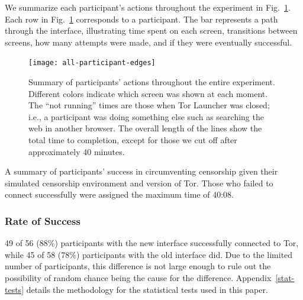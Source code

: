 \documentclass[USenglish,oneside,twocolumn]{article}
\begin{document}
{We summarize each participant's actions throughout the experiment in Fig.~\ref{fig:all-participant-edges}.
Each row in Fig.~\ref{fig:all-participant-edges} corresponds to a participant. The bar represents a path through the interface, illustrating time spent on each screen, transitions between screens, how many attempts were made, and if they were eventually successful. 

\begin{figure}
\centering
\texttt{[image: all-participant-edges]}
\caption{
Summary of participants' actions throughout the entire experiment.
Different colors indicate which screen was shown at each moment.
The ``not running'' times are those when Tor Launcher was closed;
i.e., a participant was doing something else
such as searching the web in another browser.
The overall length of the lines show the total time to completion,
except for those we cut off after approximately 40 minutes.
}
\label{fig:all-participant-edges}
\end{figure}

\begin{table}
\centering

\caption{
A summary of participants' success in circumventing censorship
given their simulated censorship environment and version of Tor. Those who
failed to connect successfully were assigned the maximum time of 40:08.
}
\label{table:participant-summary}
\end{table}

\subsubsection{Rate of Success} 
49 of 56 (88\%) participants with the new interface successfully connected to Tor, while 45 of 58 (78\%) participants with the old interface did. Due to the limited number of participants, this difference is not large enough to rule out the possibility of random chance being the cause for the difference. Appendix~\ref{stat-tests} details the methodology for the statistical tests used in this paper. 


}
\end{document}
